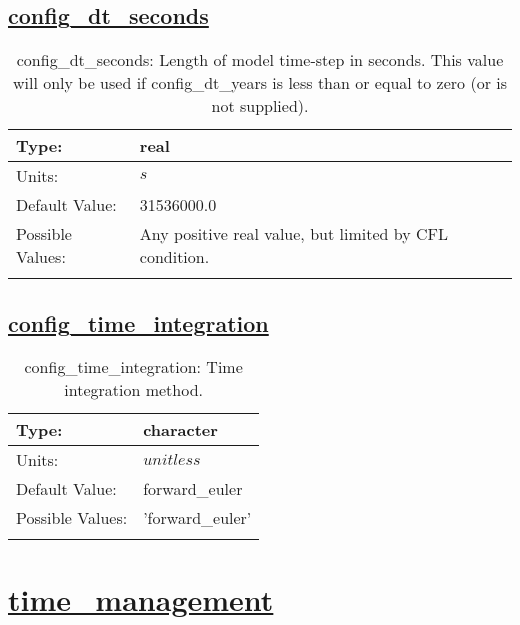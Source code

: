 \subsection[config\_dt\_seconds]{\hyperref[sec:nm_tab_time_integration]{config\_dt\_seconds}}
\label{subsec:nm_sec_config_dt_seconds}
\begin{center}
\begin{longtable}{| p{2.0in} | p{4.0in} |}
    \hline
    Type: & real \\
    \hline
    Units: & $s$ \\
    \hline
    Default Value: & 31536000.0 \\
    \hline
    Possible Values: & Any positive real value, but limited by CFL condition. \\
    \hline
    \caption{config\_dt\_seconds: Length of model time-step in seconds.  This value will only be used if config\_dt\_years is less than or equal to zero (or is not supplied).}
\end{longtable}
\end{center}
\subsection[config\_time\_integration]{\hyperref[sec:nm_tab_time_integration]{config\_time\_integration}}
\label{subsec:nm_sec_config_time_integration}
\begin{center}
\begin{longtable}{| p{2.0in} | p{4.0in} |}
    \hline
    Type: & character \\
    \hline
    Units: & $unitless$ \\
    \hline
    Default Value: & forward\_euler \\
    \hline
    Possible Values: & 'forward\_euler' \\
    \hline
    \caption{config\_time\_integration: Time integration method.}
\end{longtable}
\end{center}
\section[time\_management]{\hyperref[sec:nm_tab_time_management]{time\_management}}
\label{sec:nm_sec_time_management}
